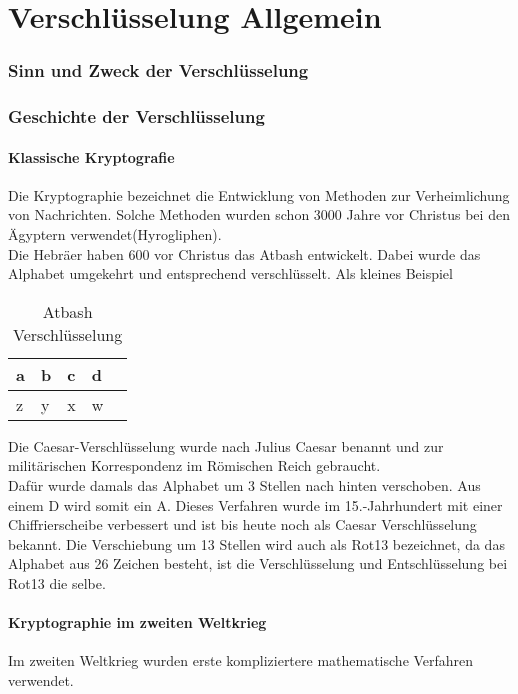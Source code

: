 \part{Verschlüsselung Allgemein}
\section{Sinn und Zweck der Verschlüsselung}


\section{Geschichte der Verschlüsselung}
\subsection{Klassische Kryptografie}
Die Kryptographie bezeichnet die Entwicklung von Methoden zur Verheimlichung von Nachrichten.
Solche Methoden wurden schon 3000 Jahre vor Christus bei den Ägyptern verwendet(Hyrogliphen). \\
Die Hebräer haben 600 vor Christus das Atbash entwickelt. Dabei wurde das Alphabet umgekehrt und entsprechend verschlüsselt.
Als kleines Beispiel\\
\begin{table}[ht]
\caption{Atbash Verschlüsselung}
\begin{tabular}{p|p|p|p|p}
  \midrule
  a & b & c & d \\
   \midrule
  z & y & x & w \\
  \bottomrule
\end{tabular}
\end{table}


Die Caesar-Verschlüsselung wurde nach Julius Caesar benannt und zur militärischen Korrespondenz im Römischen Reich gebraucht.\\
Dafür wurde damals das Alphabet um 3 Stellen nach hinten verschoben. Aus einem D wird somit ein A. Dieses Verfahren wurde im 15.-Jahrhundert mit einer
Chiffrierscheibe verbessert und ist bis heute noch als Caesar Verschlüsselung bekannt. Die Verschiebung um 13 Stellen wird auch als Rot13 bezeichnet, 
da das Alphabet aus 26 Zeichen besteht, ist die Verschlüsselung und Entschlüsselung bei Rot13 die selbe.


\subsection{Kryptographie im zweiten Weltkrieg}
Im zweiten Weltkrieg wurden erste kompliziertere mathematische Verfahren verwendet. 

